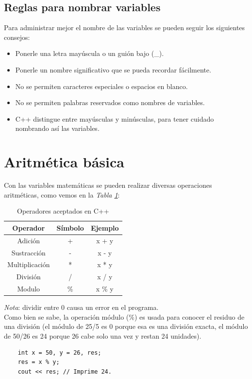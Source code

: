 \subsection{Reglas para nombrar variables}
\hspace{0.55cm}Para administrar mejor el nombre de las variables se pueden seguir los siguientes consejos:
\begin{itemize}
    \item Ponerle una letra mayúscula o un guión bajo (\_).
    \item Ponerle un nombre significativo que se pueda recordar fácilmente.
    \item No se permiten caracteres especiales o espacios en blanco.
    \item No se permiten palabras reservados como nombres de variables.
    \item C++ distingue entre mayúsculas y minúsculas, para tener cuidado nombrando así las variables.
\end{itemize}



\section{Aritmética básica}
\hspace{0.55cm}Con las variables matemáticas se pueden realizar diversas operaciones aritméticas, como vemos en la \textit{Tabla \ref{tab: 1}}:
\begin{table}[H]
    \begin{center}
        \caption{Operadores aceptados en C++}
        \label{tab: 1}
        \begin{tabular}{c c c}
            \hline
            \textbf{Operador} & \textbf{Símbolo} & \textbf{Ejemplo} \\
            \hline
            Adición			& +		& x + y \\
            Sustracción		& -		& x - y \\
            Multiplicación	& *		& x * y \\
            División			& /		& x / y \\
            Modulo			& \%		& x \% y \\
            \hline
        \end{tabular}
    \end{center}
\end{table}

\textit{Nota}: dividir entre 0 causa un error en el programa.\\
Como bien se sabe, la operación módulo (\%) es usada para conocer el residuo de una división (el módulo de 25/5 es 0 porque esa es una división exacta, el módulo de 50/26 es 24 porque 26 cabe solo una vez y restan 24 unidades).
\begin{lstlisting}
    int x = 50, y = 26, res;
    res = x % y;
    cout << res; // Imprime 24.
\end{lstlisting}

